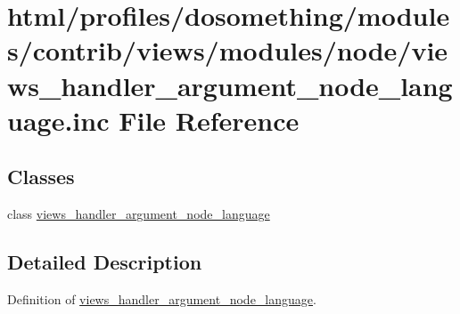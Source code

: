 \hypertarget{views__handler__argument__node__language_8inc}{
\section{html/profiles/dosomething/modules/contrib/views/modules/node/views\_\-handler\_\-argument\_\-node\_\-language.inc File Reference}
\label{views__handler__argument__node__language_8inc}
}
\subsection*{Classes}
\begin{DoxyCompactItemize}
\item 
class \hyperlink{classviews__handler__argument__node__language}{views\_\-handler\_\-argument\_\-node\_\-language}
\end{DoxyCompactItemize}


\subsection{Detailed Description}
Definition of \hyperlink{classviews__handler__argument__node__language}{views\_\-handler\_\-argument\_\-node\_\-language}. 